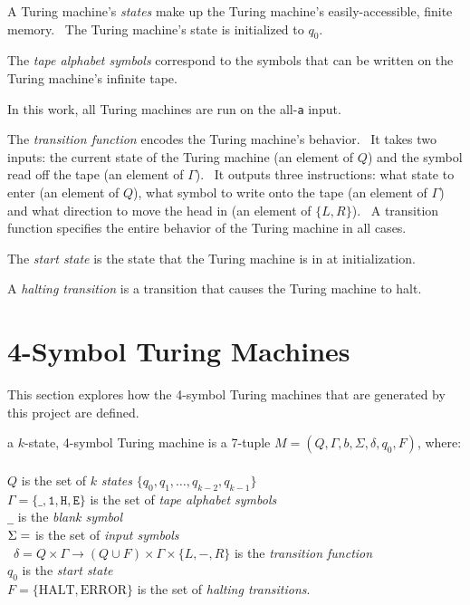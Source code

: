\documentclass[11pt]{article}
\begin{document}
A Turing machine's \emph{states} make up the Turing machine's easily-accessible, finite memory. \ The Turing machine's state is initialized to $q_0$.

The \emph{tape alphabet symbols} correspond to the symbols that can be written on the Turing machine's infinite tape.

In this work, all Turing machines are run on the all-\texttt{a} input.

The \emph{transition function} encodes the Turing machine's behavior. \ It takes two inputs: the current state of the Turing machine (an element of $Q$) and the symbol read off the tape (an element of $\Gamma$). \ It outputs three instructions: what state to enter (an element of $Q$), what symbol to write onto the tape (an element of $\Gamma$) and what direction to move the head in (an element of $\{L, R\}$). \ A transition function specifies the entire behavior of the Turing machine in all cases.

The \emph{start state} is the state that the Turing machine is in at initialization.

A \emph{halting transition} is a transition that causes the Turing machine to halt. 

\section{4-Symbol Turing Machines}

This section explores how the 4-symbol Turing machines that are generated by this project are defined.

a $k$-state, 4-symbol Turing machine is a 7-tuple $M = (Q, \Gamma, b, \Sigma, \delta, q_0, F)$, where: \\ \\
$Q$ is the set of $k$ \emph{states} $\{q_0, q_1, \dots, q_{k-2}, q_{k-1}\}$ \\
$\Gamma = \{\texttt{_}, \texttt{1}, \texttt{H}, \texttt{E}\}$ is the set of \emph{tape alphabet symbols} \\
\texttt{_} is the \emph{blank symbol} \\
$\Sigma = \empty$ is the set of \emph{input symbols} \\\
$\delta = Q \times \Gamma \rightarrow (Q \cup F) \times \Gamma \times \{L, -, R\}$ is the \emph{transition function} \\
$q_0$ is the \emph{start state} \\
$F = \{\textrm{HALT}, \textrm{ERROR}\}$ is the set of \emph{halting transitions}. \\
\end{document}
